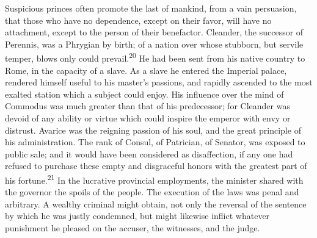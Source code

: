 

Suspicious princes often promote the last of mankind, from a vain
persuasion, that those who have no dependence, except on their
favor, will have no attachment, except to the person of their
benefactor. Cleander, the successor of Perennis, was a Phrygian
by birth; of a nation over whose stubborn, but servile temper,
blows only could prevail.\textsuperscript{20} He had been sent from his native
country to Rome, in the capacity of a slave. As a slave he
entered the Imperial palace, rendered himself useful to his
master’s passions, and rapidly ascended to the most exalted
station which a subject could enjoy. His influence over the mind
of Commodus was much greater than that of his predecessor; for
Cleander was devoid of any ability or virtue which could inspire
the emperor with envy or distrust. Avarice was the reigning
passion of his soul, and the great principle of his
administration. The rank of Consul, of Patrician, of Senator, was
exposed to public sale; and it would have been considered as
disaffection, if any one had refused to purchase these empty and
disgraceful honors with the greatest part of his fortune.\textsuperscript{21} In
the lucrative provincial employments, the minister shared with
the governor the spoils of the people. The execution of the laws
was penal and arbitrary. A wealthy criminal might obtain, not
only the reversal of the sentence by which he was justly
condemned, but might likewise inflict whatever punishment he
pleased on the accuser, the witnesses, and the judge.



